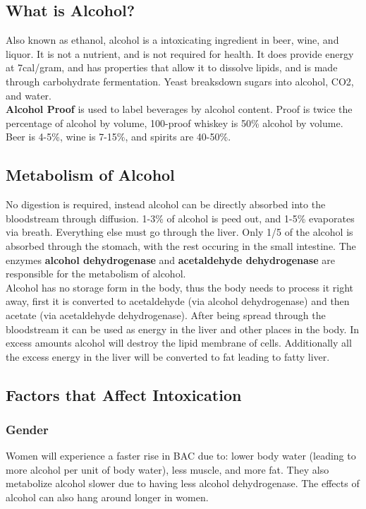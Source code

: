 \documentclass[letterpaper, 11pt]{article}
\begin{document}
\subsection{What is Alcohol?}
\label{sec:org9816d40}
Also known as ethanol, alcohol is a intoxicating ingredient in beer, wine, and liquor. It is not a nutrient, and is not required for health. It does provide energy at 7cal/gram, and has properties that allow it to dissolve lipids, and is made through carbohydrate fermentation. Yeast breaksdown sugars into alcohol, CO2, and water.\\
\textbf{Alcohol Proof} is used to label beverages by alcohol content. Proof is twice the percentage of alcohol by volume, 100-proof whiskey is 50\% alcohol by volume. Beer is 4-5\%, wine is 7-15\%, and spirits are 40-50\%.\\
\subsection{Metabolism of Alcohol}
\label{sec:org33922ad}
No digestion is required, instead alcohol can be directly absorbed into the bloodstream through diffusion. 1-3\% of alcohol is peed out, and 1-5\% evaporates via breath. Everything else must go through the liver. Only 1/5 of the alcohol is absorbed through the stomach, with the rest occuring in the small intestine. The enzymes \textbf{alcohol dehydrogenase} and \textbf{acetaldehyde dehydrogenase} are responsible for the metabolism of alcohol.\\
Alcohol has no storage form in the body, thus the body needs to process it right away, first it is converted to acetaldehyde (via alcohol dehydrogenase) and then acetate (via acetaldehyde dehydrogenase). After being spread through the bloodstream it can be used as energy in the liver and other places in the body. In excess amounts alcohol will destroy the lipid membrane of cells. Additionally all the excess energy in the liver will be converted to fat leading to fatty liver.\\
\subsection{Factors that Affect Intoxication}
\label{sec:orgc83f244}
\subsubsection{Gender}
\label{sec:orgedf3105}
Women will experience a faster rise in BAC due to: lower body water (leading to more alcohol per unit of body water), less muscle, and more fat. They also metabolize alcohol slower due to having less alcohol dehydrogenase. The effects of alcohol can also hang around longer in women.\\
\end{document}
